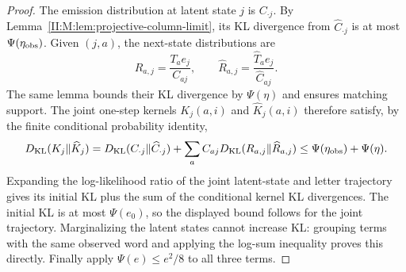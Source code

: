 \begin{proof}
The emission distribution at latent state $j$ is $C_{\cdot j}$.
By Lemma~\ref{II:M:lem:projective-column-limit}, its KL divergence from
$\widehat C_{\cdot j}$ is at most $\Psi(\eta_{\rm obs})$.
Given $(j,a)$, the next-state distributions are
\[
 R_{a,j}=\frac{T_ae_j}{C_{aj}},\qquad
 \widehat R_{a,j}=\frac{\widehat T_ae_j}{\widehat C_{aj}}.
\]
The same lemma bounds their KL divergence by $\Psi(\eta)$ and
ensures matching support. The joint one-step kernels $K_j(a,i)$ and
$\widehat K_j(a,i)$ therefore satisfy, by the finite conditional
probability identity,
\[
 D_{\rm KL}(K_j\|\widehat K_j)
 =D_{\rm KL}(C_{\cdot j}\|\widehat C_{\cdot j})
  +\sum_a C_{aj}D_{\rm KL}(R_{a,j}\|\widehat R_{a,j})
 \le\Psi(\eta_{\rm obs})+\Psi(\eta).
\]
Expanding the log-likelihood ratio of the joint latent-state and letter
trajectory gives its initial KL plus the sum of the conditional kernel
KL divergences. The initial KL is at most $\Psi(e_0)$, so the displayed
bound follows for the joint trajectory. Marginalizing the latent states
cannot increase KL: grouping terms with the same observed word and
applying the log-sum inequality proves this directly. Finally apply
$\Psi(e)\le e^2/8$ to all three terms.
\end{proof}
